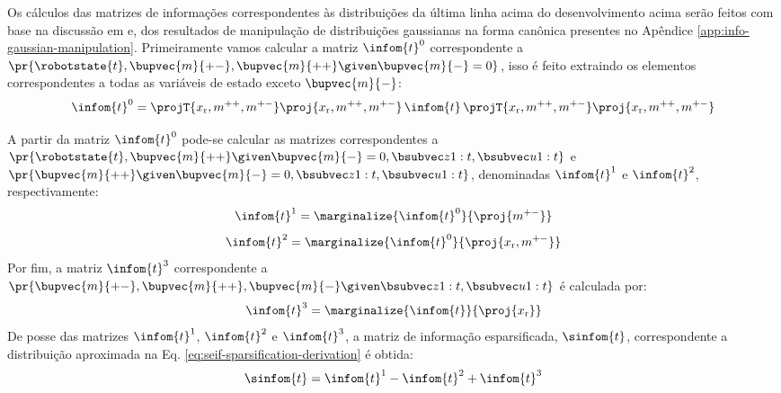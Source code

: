 Os cálculos das matrizes de informações correspondentes às distribuições da última linha acima do desenvolvimento acima serão feitos com base na discussão em \cite[p.~401]{bongard2006probabilistic} e, dos resultados de manipulação de distribuições gaussianas na forma canônica presentes no Apêndice \ref{app:info-gaussian-manipulation}. 
Primeiramente vamos calcular a matriz $\infom{t}^{0}$ correspondente 
a $\pr{\robotstate{t}, \bupvec{m}{+-}, \bupvec{m}{++} \given \bupvec{m}{-} = 0}$, isso é feito extraindo os elementos correspondentes a 
todas as variáveis de estado exceto $\bupvec{m}{-}$:
\newcommand{\OmegaZeroValue}{\projT{x_\mathrm{r}, m^{++}, m^{+-}} \proj{x_\mathrm{r}, m^{++}, m^{+-}} \, \infom{t} \, \projT{x_\mathrm{r}, m^{++}, m^{+-}} \proj{x_\mathrm{r}, m^{++}, m^{+-}}}
\begin{equation}
  \infom{t}^0 = \OmegaZeroValue
  \label{eq:seif-omega-zero}
\end{equation}

A partir da matriz $\infom{t}^0$ pode-se calcular as matrizes 
correspondentes a\\
$\pr{\robotstate{t},\bupvec{m}{++}  \given \bupvec{m}{-}=0, \slamvars}$ e $\pr{\bupvec{m}{++}  \given \bupvec{m}{-}=0, \slamvars}$, denominadas $\infom{t}^1$ e $\infom{t}^2$, 
respectivamente:
\newcommand{\OmegaOneValue}{\marginalize{\infom{t}^0}{\proj{m^{+-}}}}
\begin{equation}
  \infom{t}^1 = \OmegaOneValue
\end{equation}
\newcommand{\OmegaTwoValue}{\marginalize{\infom{t}^0}{\proj{x_\mathrm{r}, m^{+-}}}}
\begin{equation}
  \infom{t}^2 = \OmegaTwoValue
\end{equation}
Por fim, a matriz $\infom{t}^3$ correspondente a $\pr{\bupvec{m}{+-}, \bupvec{m}{++}, \bupvec{m}{-} \given \slamvars}$ é calculada por:
\newcommand{\OmegaThreeValue}{\marginalize{\infom{t}}{\proj{x_\mathrm{r}}}}
\begin{equation}
  \infom{t}^3 = \OmegaThreeValue
\end{equation}
De posse das matrizes $\infom{t}^1$, $\infom{t}^2$ e $\infom{t}^3$, a 
matriz de informação esparsificada, $\sinfom{t}$, correspondente a distribuição 
aproximada na Eq. \ref{eq:seif-sparsification-derivation} é obtida:
\begin{equation}
  \sinfom{t} = \infom{t}^1 - \infom{t}^2 + \infom{t}^3
  \label{eq:seif-sparse-infom}
\end{equation}

